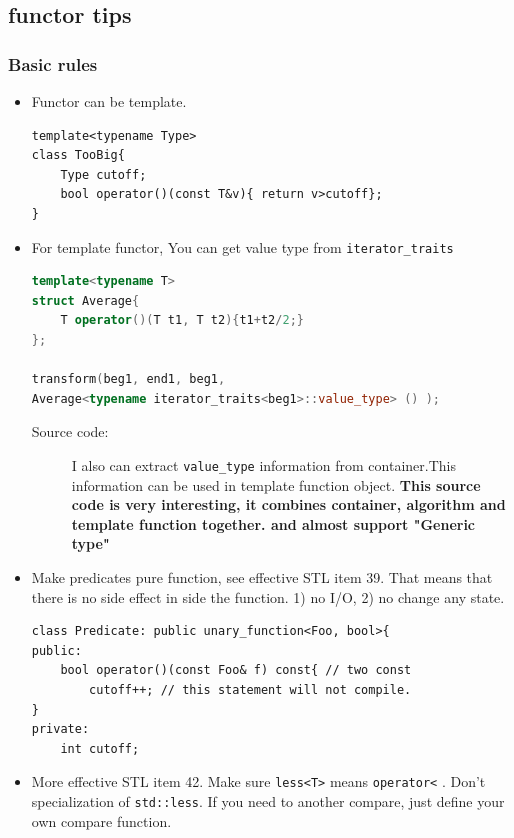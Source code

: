 \documentclass[a4paper,11pt,twoside]{book}
\begin{document}
\subsection{functor tips}
\subsubsection{Basic rules}

\begin{itemize}


\item Functor can be template.
\begin{lstlisting}[numbers=none]
template<typename Type>
class TooBig{
	Type cutoff;
	bool operator()(const T&v){ return v>cutoff};
}
\end{lstlisting}

\item For template functor, You can get value type from \texttt{iterator\_traits}
\begin{lstlisting}[frame=single, language=c++]
template<typename T>
struct Average{
	T operator()(T t1, T t2){t1+t2/2;}
};

transform(beg1, end1, beg1,
Average<typename iterator_traits<beg1>::value_type> () );
\end{lstlisting}
\begin{description}
	\item[Source code:] I also can extract \texttt{value\_type} information from container.This information can be used in template function object. \textbf{This source code is very interesting, it combines container, algorithm and template function together. and almost support "Generic type"}
\end{description}

\item Make predicates pure function, see effective STL item 39. That means that there is no side effect in side the function. 1) no I/O, 2) no change any state.
\begin{lstlisting}[numbers=none]
class Predicate: public unary_function<Foo, bool>{
public:
	bool operator()(const Foo& f) const{ // two const
		cutoff++; // this statement will not compile.
}
private:
	int cutoff;
\end{lstlisting}

\item More effective STL item 42. Make sure \texttt{less<T>} means \texttt{operator<} . Don't specialization of \texttt{std::less}. If you need to another compare, just define your own compare function.
\end{itemize}
\end{document}
